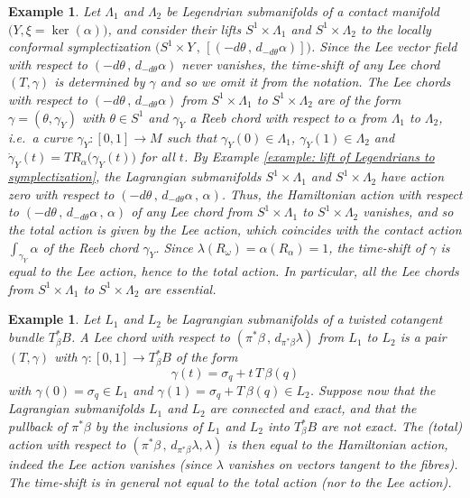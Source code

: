 \documentclass{amsart}
\newtheorem{example}[thm]{Example}
\theoremstyle{remark}
\begin{document}
\begin{example}\label{example: Lee chords lifts of Legendrians}
Let $\Lambda_1$ and $\Lambda_2$ be Legendrian submanifolds
of a contact manifold $\big( Y , \xi = \ker (\alpha) \big)$,
and consider their lifts
$S^1 \times \Lambda_1$ and $S^1 \times \Lambda_2$
to the locally conformal symplectization
$\big( S^1 \times Y \,,\, [( -d\theta \,,\, d_{-d\theta}\alpha )] \big)$.
Since the Lee vector field
with respect to $( -d\theta \,,\, d_{-d\theta}\alpha )$
never vanishes,
the time-shift of any Lee chord $(T, \gamma)$
is determined by $\gamma$
and so we omit it from the notation.
The Lee chords with respect to $( -d\theta \,,\, d_{-d\theta}\alpha )$
from $S^1 \times \Lambda_1$ to $S^1 \times \Lambda_2$
are of the form $\gamma = (\theta, \gamma_Y)$
with $\theta \in S^1$
and $\gamma_Y$ a Reeb chord with respect to $\alpha$
from $\Lambda_1$ to $\Lambda_2$,
i.e.\ a curve $\gamma_Y: [0,1] \rightarrow M$
such that $\gamma_Y (0) \in \Lambda_1$,
$\gamma_Y (1) \in \Lambda_2$
and $\dot{\gamma}_Y(t) = T R_{\alpha} \big(\gamma_Y(t)\big)$ for all $t$.
By Example \ref{example: lift of Legendrians to symplectization},
the Lagrangian submanifolds $S^1 \times \Lambda_1$ and $S^1 \times \Lambda_2$
have action zero
with respect to $(-d\theta \,,\, d_{-d\theta}\alpha \,,\, \alpha)$.
Thus,
the Hamiltonian action
with respect to $(-d\theta \,,\, d_{-d\theta}\alpha \,,\, \alpha)$
of any Lee chord from $S^1 \times \Lambda_1$ to $S^1 \times \Lambda_2$
vanishes,
and so the total action is given by the Lee action,
which coincides with the contact action $\int_{\gamma_Y}\alpha$
of the Reeb chord $\gamma_Y$.
Since $\lambda (R_{\omega}) = \alpha (R_{\alpha}) = 1$,
the time-shift of $\gamma$ is equal to the Lee action,
hence to the total action.
In particular,
all the Lee chords from $S^1 \times \Lambda_1$ to $S^1 \times \Lambda_2$
are essential.
\end{example}

\begin{example}\label{example: action cotangent bundle}
Let $L_1$ and $L_2$ be Lagrangian submanifolds
of a twisted cotangent bundle
$T_{\beta}^{\ast}B$.
A Lee chord
with respect to $(\pi^{\ast}\beta \,,\, d_{\pi^{\ast}\beta} \lambda)$
from $L_1$ to $L_2$
is a pair $(T, \gamma)$
with $\gamma: [0, 1] \rightarrow T_{\beta}^{\ast}B$
of the form
\[
\gamma(t) = \sigma_q + t \, T \, \beta(q)
\]
with $\gamma (0) = \sigma_q \in L_1$
and $\gamma (1) = \sigma_q + T \, \beta(q) \in L_2$.
Suppose now that the Lagrangian submanifolds $L_1$ and $L_2$
are connected and exact,
and that the pullback of $\pi^{\ast}\beta$
by the inclusions of $L_1$ and $L_2$ into $T_{\beta}^{\ast}B$
are not exact.
The (total) action
with respect to $(\pi^{\ast}\beta \,,\, d_{\pi^{\ast}\beta} \lambda, \lambda)$
is then equal to the Hamiltonian action,
indeed the Lee action vanishes
(since $\lambda$ vanishes
on vectors tangent to the fibres).
The time-shift is in general not equal to the total action
(nor to the Lee action).
\end{example}
\end{document}
